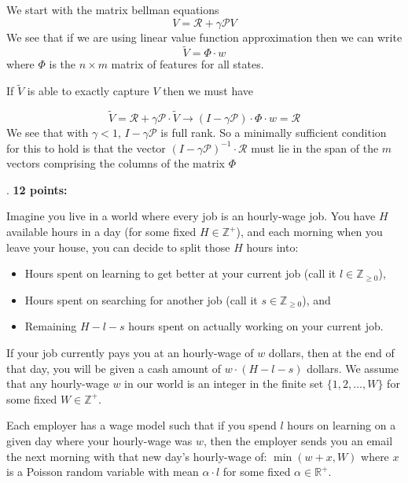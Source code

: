 \documentclass[12pt]{exam}
\begin{document}
\begin{questions}
\begin{solution}
We start with the matrix bellman equations
\[V = \mathcal{R} + \gamma \mathcal{P} V\]
We see that if we are using linear value function approximation then we can write
\[\tilde{V} = \Phi \cdot w\]
where $\Phi$ is the $n \times m$ matrix of features for all states.

If $\tilde{V}$ is able to exactly capture $V$ then we must have 

\[\tilde{V} = \mathcal{R} + \gamma \mathcal{P} \cdot \tilde{V} \xrightarrow{} (I - \gamma \mathcal{P}) \cdot \Phi \cdot w = \mathcal{R}\]
We see that with $\gamma < 1$, $I - \gamma \mathcal{P}$ is full rank. So a minimally sufficient condition for this to hold is that the vector $(I - \gamma \mathcal{P})^{-1} \cdot \mathcal{R}$ must lie in the span of the $m$ vectors comprising the columns of the matrix $\Phi$

\end{solution}

\newpage

. {\bf 12 points:}

Imagine you live in a world where every job is an hourly-wage job. You have $H$ available hours in a day (for some fixed $H \in \mathbb{Z}^+$), and each morning when you leave your house, you can decide to split those $H$ hours into:
\begin{itemize}
    \item Hours spent on learning to get better at your current job (call it $l \in \mathbb{Z}_{\geq 0}$),
    \item Hours spent on searching for another job (call it $s \in \mathbb{Z}_{\geq 0}$), and
    \item Remaining $H-l-s$ hours spent on actually working on your current job.
\end{itemize}
    
If your job currently pays you at an hourly-wage of $w$ dollars, then at the end of that day, you will be given a cash amount of $w \cdot (H-l-s)$ dollars. We assume that any hourly-wage $w$ in our world is an integer in the finite set $\{1, 2, \ldots, W\}$ for some fixed $W \in \mathbb{Z}^+$.

Each employer has a wage model such that if you spend $l$ hours on learning on a given day where your hourly-wage was $w$, then the employer sends you an email the next morning with that new day's hourly-wage of: $\min(w + x,W)$ where $x$ is a Poisson random variable with mean $\alpha \cdot l$ for some fixed $\alpha \in \mathbb{R}^+$.


\end{questions}
\end{document}
